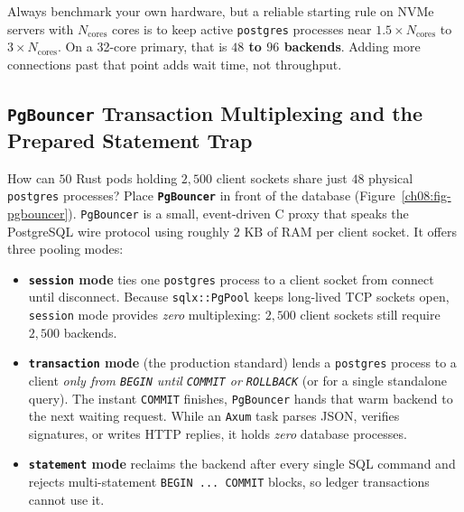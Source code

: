 Always benchmark your own hardware, but a reliable starting rule on NVMe servers
with $N_{\text{cores}}$ cores is to keep active \texttt{postgres} processes near
$1.5 \times N_{\text{cores}}$ to $3 \times N_{\text{cores}}$. On a 32-core primary,
that is \textbf{$48$ to $96$ backends}. Adding more connections past that point adds
wait time, not throughput.

\subsection{\texttt{PgBouncer} Transaction Multiplexing and the Prepared Statement Trap}
\label{ch08:pgbouncer}

How can $50$ Rust pods holding $2{,}500$ client sockets share just $48$ physical
\texttt{postgres} processes? Place \textbf{\texttt{PgBouncer}} in front of the
database (Figure~\ref{ch08:fig-pgbouncer}). \texttt{PgBouncer} is a small,
event-driven C proxy that speaks the PostgreSQL wire protocol using roughly
$2\text{ KB}$ of RAM per client socket. It offers three pooling modes:

\begin{itemize}
  \item \textbf{\texttt{session} mode} ties one \texttt{postgres} process to a
    client socket from connect until disconnect. Because \texttt{sqlx::PgPool}
    keeps long-lived TCP sockets open, \texttt{session} mode provides \emph{zero}
    multiplexing: $2{,}500$ client sockets still require $2{,}500$ backends.
  \item \textbf{\texttt{transaction} mode} (the production standard) lends a
    \texttt{postgres} process to a client \emph{only from \texttt{BEGIN} until
    \texttt{COMMIT} or \texttt{ROLLBACK}} (or for a single standalone query). The
    instant \texttt{COMMIT} finishes, \texttt{PgBouncer} hands that warm backend to
    the next waiting request. While an \texttt{Axum} task parses JSON, verifies
    signatures, or writes HTTP replies, it holds \emph{zero} database processes.
  \item \textbf{\texttt{statement} mode} reclaims the backend after every single
    SQL command and rejects multi-statement \texttt{BEGIN ... COMMIT} blocks, so
    ledger transactions cannot use it.
\end{itemize}

